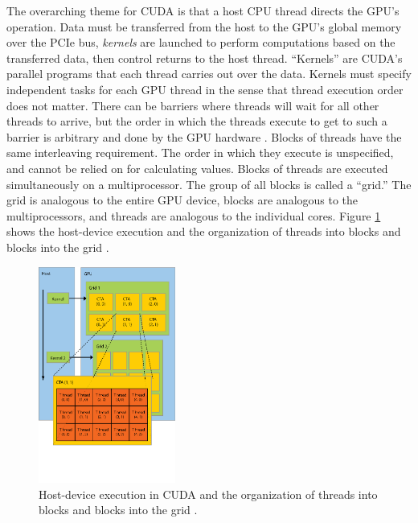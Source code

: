 The overarching theme for CUDA is that a host CPU thread directs the GPU's operation.  Data must be transferred from the host to the GPU's global memory over the PCIe bus, \emph{kernels} are launched to perform computations based on the transferred data, then control returns to the host thread.  ``Kernels'' are CUDA's parallel programs that each thread carries out over the data.  Kernels must specify independent tasks for each GPU thread in the sense that thread execution order does not matter.  There can be barriers where threads will wait for all other threads to arrive, but the order in which the threads execute to get to such a barrier is arbitrary and done by the GPU hardware \cite{cuda}.  Blocks of threads have the same interleaving requirement.  The order in which they execute is unspecified, and cannot be relied on for calculating values.%
  Blocks of threads are executed simultaneously on a multiprocessor.  The group of all blocks is called a ``grid.''  The grid is analogous to the entire GPU device, blocks are analogous to the multiprocessors, and threads are analogous to the individual cores. Figure \ref{cuda_grid_launch} shows the host-device execution and the organization of threads into blocks and blocks into the grid \cite{cuda}.

\begin{figure}[h!] 
  \centering
    \includegraphics[width=0.4\textwidth,trim= 0cm 2.5cm 0cm 0cm]{graphics/CUDA_grid_launch.eps}
     \caption[Host-device execution in CUDA and the organization of threads into blocks and blocks into the grid.]{ Host-device execution in CUDA and the organization of threads into blocks and blocks into the grid \cite{cuda_ptx_isa}. \label{cuda_grid_launch}}
\end{figure}

